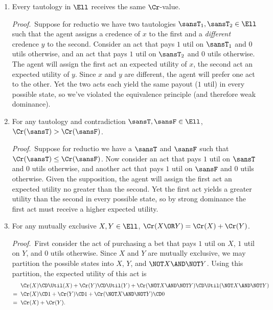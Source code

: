 \begin{enumerate}
\item Every tautology in $\Ell$ receives the same $\Cr$-value.

\emph{Proof}.\, Suppose for reductio we have two tautologies $\sansT_1, \sansT_2 \in \Ell$ such that the agent assigns a credence of $x$ to the first and a \emph{different} credence $y$ to the second. Consider an act that pays $1$ util on $\sansT_1$ and $0$ utils otherwise, and an act that pays $1$ util on $\sansT_2$ and $0$ utils otherwise. The agent will assign the first act an expected utility of $x$, the second act an expected utility of $y$. Since $x$ and $y$ are different, the agent will prefer one act to the other. Yet the two acts each yield the same payout ($1$ util) in every possible state, so we've violated the equivalence principle (and therefore weak dominance).

\item For any tautology and contradiction $\sansT, \sansF \in \Ell$, $\Cr(\sansT)>\Cr(\sansF)$.

\emph{Proof}.\, Suppose for reductio we have a $\sansT$ and $\sansF$ such that $\Cr(\sansT) \le \Cr(\sansF)$. Now consider an act that pays $1$ util on $\sansT$ and $0$ utils otherwise, and another act that pays $1$ util on $\sansF$ and $0$ utils otherwise. Given the supposition, the agent will assign the first act an expected utility no greater than the second. Yet the first act yields a greater utility than the second in every possible state, so by strong dominance the first act must receive a higher expected utility.

\item For any mutually exclusive $X, Y \in \Ell$, $\Cr(X \OR Y)=\Cr(X)+\Cr(Y)$.

\emph{Proof}.\, First consider the act of purchasing a bet that pays $1$ util on $X$, $1$ util on $Y$, and $0$ utils otherwise. Since $X$ and $Y$ are mutually exclusive, we may partition the possible states into $X$, $Y$, and $\NOT X \AND \NOT Y$. Using this partition, the expected utility of this act is
\begin{equation}
\begin{aligned}
	  &\;\; \Cr(X) \CD \Util(X) + \Cr(Y) \CD \Util(Y) + \Cr(\NOT X \AND \NOT Y) \CD \Util(\NOT X \AND \NOT Y)\\
	= &\;\; \Cr(X) \CD 1 + \Cr(Y) \CD 1 + \Cr(\NOT X \AND \NOT Y) \CD 0\\
	= &\;\; \Cr(X) + \Cr(Y).
\end{aligned}
\end{equation}


\end{enumerate}
